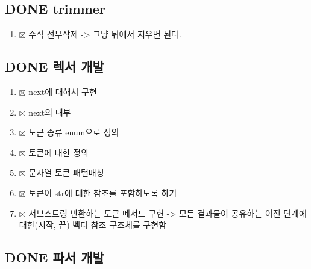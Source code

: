 \documentclass[11pt]{article}
\begin{document}
\subsection{{\bfseries\sffamily DONE} trimmer}
\label{sec:org1173335}

\begin{enumerate}
\item{$\boxtimes$} 주석 전부삭제 -> 그냥 뒤에서 지우면 된다.
\end{enumerate}
\subsection{{\bfseries\sffamily DONE} 렉서 개발}
\label{sec:orgd950f6d}

\begin{enumerate}
\item{$\boxtimes$} next에 대해서 구현
\item{$\boxtimes$} next의 내부
\item{$\boxtimes$} 토큰 종류 enum으로 정의
\item{$\boxtimes$} 토큰에 대한 정의
\item{$\boxtimes$} 문자열 토큰 패턴매칭
\item{$\boxtimes$} 토큰이 str에 대한 참조를 포함하도록 하기
\item{$\boxtimes$} 서브스트링 반환하는 토큰 메서드 구현 -> 모든 결과물이 공유하는 이전 단계에 대한(시작, 끝) 벡터 참조 구조체를 구현함
\end{enumerate}
\subsection{{\bfseries\sffamily DONE} 파서 개발}
\label{sec:org739c8d6}
\end{document}
